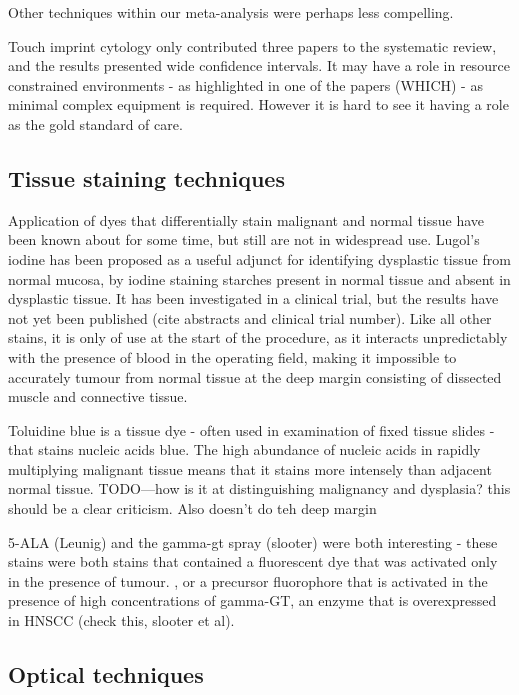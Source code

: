Other techniques within our meta-analysis were perhaps less compelling.

Touch imprint cytology only contributed three papers to the systematic review, and the results presented wide confidence intervals. 
It may have a role in resource constrained environments - as highlighted in one of the papers (WHICH) - as minimal complex equipment is required. 
However it is hard to see it having a role as the gold standard of care.

\subsection{Tissue staining techniques}

Application of dyes that differentially stain malignant and normal tissue have been known about for some time, but still are not in widespread use.
Lugol's iodine has been proposed as a useful adjunct for identifying dysplastic tissue from normal mucosa, by iodine staining starches present in normal tissue and absent in dysplastic tissue.
It has been investigated in a clinical trial, but the results have not yet been published (cite abstracts and clinical trial number).
Like all other stains, it is only of use at the start of the procedure, as it interacts unpredictably with the presence of blood in the operating field, making it impossible to accurately tumour from normal tissue at the deep margin consisting of dissected muscle and connective tissue.

Toluidine blue is a tissue dye - often used in examination of fixed tissue slides - that stains nucleic acids blue.
The high abundance of nucleic acids in rapidly multiplying malignant tissue means that it stains more intensely than adjacent normal tissue.
TODO---how is it at distinguishing malignancy and dysplasia? this should be a clear criticism. 
Also doesn't do teh deep margin

5-ALA (Leunig) and the gamma-gt spray (slooter) were both interesting - these stains were both stains that contained a fluorescent dye that was activated only in the presence of tumour. 
, or a precursor fluorophore that is activated in the presence of high concentrations of gamma-GT, an enzyme that is overexpressed in HNSCC (check this, slooter et al).

\subsection{Optical techniques}


